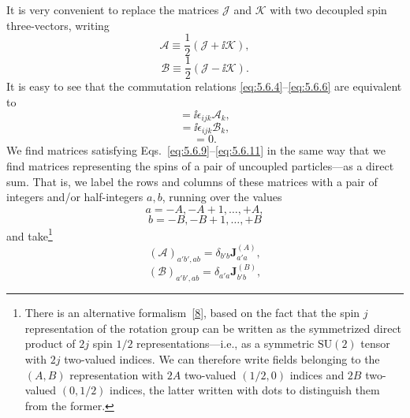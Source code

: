 It is very convenient to replace the matrices $\mathcal{J}$ and $\mathcal{K}$
with two decoupled spin three-vectors, writing
\begin{equation}
\mathcal{A}\equiv\frac12(\mathcal{J}+\ii\mathcal{K}),
\tag{5.6.7}\label{eq:5.6.7}
\end{equation}
\begin{equation}
\mathcal{B}\equiv\frac12(\mathcal{J}-\ii\mathcal{K}).
\tag{5.6.8}\label{eq:5.6.8}
\end{equation}
It is easy to see that the commutation relations \eqref{eq:5.6.4}--\eqref{eq:5.6.6} are
equivalent to
\begin{equation}
[\mathcal{A}_i,\mathcal{A}_j]=\ii\epsilon_{ijk}\mathcal{A}_k,
\tag{5.6.9}\label{eq:5.6.9}
\end{equation}
\begin{equation}
[\mathcal{B}_i,\mathcal{B}_j]=\ii\epsilon_{ijk}\mathcal{B}_k,
\tag{5.6.10}\label{eq:5.6.10}
\end{equation}
\begin{equation}
[\mathcal{A}_i,\mathcal{B}_j]=0.
\tag{5.6.11}\label{eq:5.6.11}
\end{equation}
We find matrices satisfying Eqs.~\eqref{eq:5.6.9}--\eqref{eq:5.6.11} in the same way that we
find matrices representing the spins of a pair of uncoupled particles---as a
direct sum. That is, we label the rows and columns of these matrices with a
pair of integers and/or half-integers $a,b$, running over the values
\begin{equation}
a=-A,-A+1,\ldots,+A,
\tag{5.6.12}\label{eq:5.6.12}
\end{equation}
\begin{equation}
b=-B,-B+1,\ldots,+B
\tag{5.6.13}\label{eq:5.6.13}
\end{equation}
and take\footnote{There is an alternative formalism~\hyperref[ref:5.8]{[8]}, based on the fact that
the spin $j$ representation of the rotation group can be written as the
symmetrized direct product of $2j$ spin $1/2$ representations---i.e., as a
symmetric $\mathrm{SU}(2)$ tensor with $2j$ two-valued indices. We can
therefore write fields belonging to the $(A,B)$ representation with $2A$
two-valued $(1/2,0)$ indices and $2B$ two-valued $(0,1/2)$ indices, the latter
written with dots to distinguish them from the former.}
\begin{equation}
(\mathcal{A})_{a'b',ab}=\delta_{b'b}\mathbf J^{(A)}_{a'a},
\tag{5.6.14}\label{eq:5.6.14}
\end{equation}
\begin{equation}
(\mathcal{B})_{a'b',ab}=\delta_{a'a}\mathbf J^{(B)}_{b'b},
\tag{5.6.15}\label{eq:5.6.15}
\end{equation}

